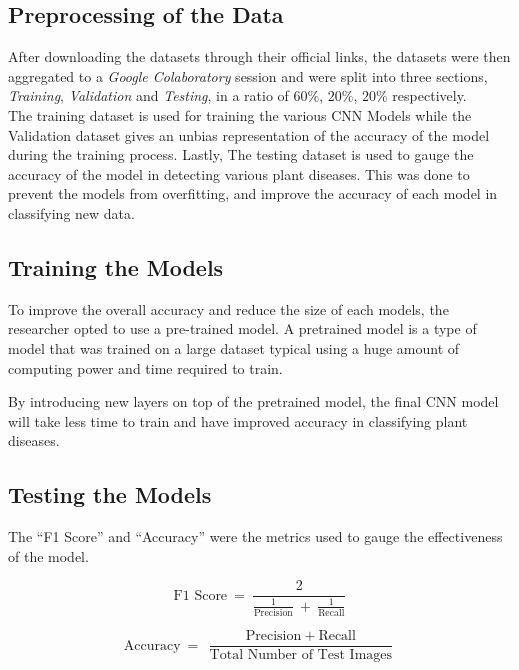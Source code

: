 \subsection{Preprocessing of the Data}
After downloading the datasets through their official links, 
the datasets were then aggregated to a \emph{Google Colaboratory} 
session and were split into three sections, \emph{Training}, \emph{Validation} and 
\emph{Testing}, in a ratio of $ 60\% $, $ 20\% $, $ 20\% $ respectively. \\

The training dataset is used for training the various CNN Models while the Validation dataset 
gives an unbias representation of the accuracy of the model during the training process. Lastly, 
The testing dataset is used to gauge the accuracy of the model in detecting various plant diseases.
This was done to prevent the models from overfitting, and improve 
the accuracy of each model in classifying new data. 

\subsection{Training the Models}
To improve the overall accuracy and reduce the size 
of each models, the researcher opted to use a pre-trained model. 
A pretrained model is a type of model that was trained on a large 
dataset typical using a huge amount of computing power and time 
required to train. 

By introducing new layers on top of the pretrained model, the final 
CNN model will take less time to train and have improved accuracy in
classifying plant diseases.


\subsection{Testing the Models}
The ``F1 Score'' and ``Accuracy'' were the metrics
used to gauge the effectiveness of the model. 

\[ 
 \text{F1 Score} \: = \: \frac{2}{\frac{1}{\text{Precision}} \: + \: 
\frac{1}{\text{Recall}}} 
\]

\[
      \text{Accuracy} \: = \: \frac{\text{Precision} \: + \: 
      \text{Recall}}{\text{Total Number of Test Images}}
\]

